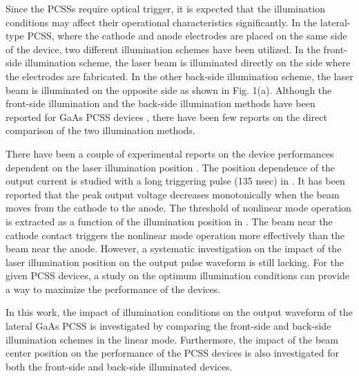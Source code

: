 \documentclass[final,5p,times,twocolumn]{elsarticle}
\newcommand{\revision}[1]{{#1}}
\begin{document}
   
   Since the PCSSs require optical trigger, it is expected that the illumination conditions may affect their operational characteristics significantly. 
   In the lateral-type PCSS, where the cathode and anode electrodes are placed on the same side of the device, two different illumination schemes have been utilized.
   In the front-side illumination scheme, the laser beam is illuminated directly on the side where the electrodes are fabricated.
   In the other back-side illumination scheme, the laser beam is illuminated on the opposite side as shown in Fig. 1(a).
   Although the front-side illumination and the back-side illumination methods have been reported for GaAs PCSS devices \cite{Hettler2012}, there have been few reports on the direct comparison of the two illumination methods.

   There have been a couple of experimental reports on the device performances dependent on the laser illumination position \cite{Wang2013,Shi2014}.
   The position dependence of the output current is studied with a long triggering pulse (135 nsec) in \cite{Wang2013}.
   It has been reported that the peak output voltage decreases monotonically when the beam moves from the cathode to the anode. 
   The threshold of nonlinear mode operation is extracted as a function of the illumination position in \cite{Shi2014}.
   The beam near the cathode contact triggers the nonlinear mode operation more effectively than the beam near the anode. 
   However, a systematic investigation on the impact of the laser illumination position on the output pulse waveform is still lacking.
   For the given PCSS devices, a study on the optimum illumination conditions can provide a way to maximize the performance of the devices.

   In this work, the impact of illumination conditions on the output waveform of the lateral GaAs PCSS is investigated by comparing the front-side and back-side illumination schemes \revision{in the linear mode}.
   Furthermore, the impact of the beam center position on the performance of the PCSS devices is also investigated for both the front-side and back-side illuminated devices.
\end{document}

